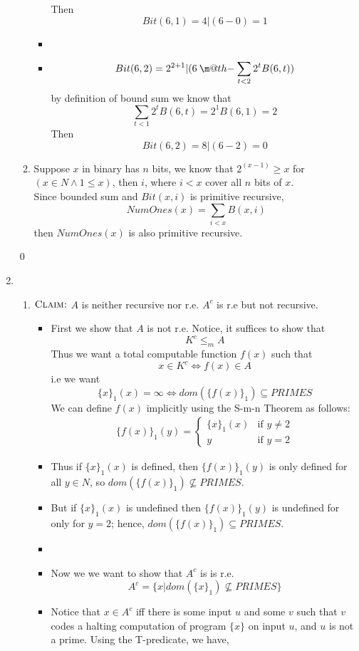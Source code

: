 \documentclass[11pt,twoside]{article}
\makeatletter
\newcommand{\dotminus}{\mathbin{\text{\@dotminus}}}
\newcommand{\@dotminus}{%
  \ooalign{\hidewidth\raise1ex\hbox{.}\hidewidth\cr$\m@th-$\cr}%
}
\makeatother
\begin{document}
\begin{enumerate}[leftmargin=0pt]
\begin{enumerate}
\begin{itemize}[label ={}]
	Then 
				\[Bit(6,1) = 4|(6-0) = 1\]
	\item 
	\item  \[Bit(6,2) = 2^{2+1} |( 6 \dotminus \sum_{t<2} 2^t B(6,t))\]
	 by definition of bound sum we know that 
	  			\[\sum_{t<1} 2^t B(6,t)=2^1B(6,1) = 2\]
	Then 
				\[Bit(6,2) = 8|(6-2) = 0\]
	 \end{itemize}
\item Suppose $x$ in binary has $n$ bits, we know that $2^{(x-1)} \geq x$ for $( x \in N \wedge 1 \leq x)$, then
$i$, where $i<x$ cover all $n$ bits of $x$.\\
	Since bounded sum and $Bit(x,i)$ is primitive recursive,
 	 \[NumOnes(x) =  \sum_{i<x} B(x,i)\]
	 then $NumOnes(x)$ is also primitive recursive. 
\end{enumerate}
\qed
\item
\begin{enumerate}
\item $\textsc {Claim:}$ $A$ is neither recursive nor r.e. $ A^c$ is r.e but not recursive.
	\begin{itemize}[label = {}]
	\item First we show that $A$ is not r.e. Notice, it suffices to show that
			\[K^c \leq_m A\]
		Thus we want a total computable function $f(x)$ such that
			\[x \in K^c \iff f(x) \in A \]
		i.e we want
			\[ \{x\}_1(x) = \infty \iff dom(\{f(x)\}_1) \subseteq PRIMES\]
		We can define $f(x)$ implicitly using the S-m-n Theorem as follows:
			\begin{gather*}
			\{f(x)\}_1(y) = 
				\begin{cases}
				\{x\}_1(x)  & \text{if } y \neq 2\\
				y  & \text{if } y = 2
				\end{cases}
			\end{gather*}
		\item Thus if $\{x\}_1(x)$ is defined, then $\{f(x)\}_1(y) $ is only defined for all $y \in N$, so $dom(\{f(x)\}_1) \not\subseteq PRIMES$. 
		\item But if $\{x\}_1(x)$ is undefined then $\{f(x)\}_1(y) $ is undefined for only for $y=2$; hence,  $dom(\{f(x)\}_1) \subseteq PRIMES$. 
		\item
	\end{itemize}
	\begin{itemize}[label = {}]
	\item Now we we want to show that $A^c$ is is r.e.
		\[A^c = \{x|  dom(\{x\}_1) \not\subseteq PRIMES\}\]
	\item Notice that $x \in A^c$ iff there is some input $u$ and some $v$ such that $v$ codes a halting computation of program $\{x\}$ on input $u$, and $u$ is not a prime. Using the T-predicate, we have,

\end{itemize}
\end{enumerate}
\end{enumerate}
\end{document}
